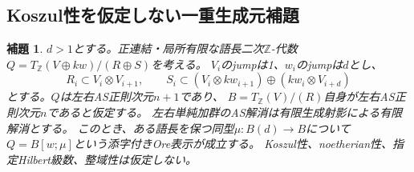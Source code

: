 \documentclass[11pt,a4paper]{ltjsarticle}
\newtheorem{lemma}[theorem]{補題}
\theoremstyle{definition}
\begin{document}
\subsection{Koszul性を仮定しない一重生成元補題}
\begin{lemma}\label{genidx:lem:one-heavy-as}
$d>1$とする。正連結・局所有限な語長二次$\mathbb Z$-代数
$Q=T_{\mathbb Z}(V\oplus kw)/(R\oplus S)$を考える。
$V_i$のjumpは1、$w_i$のjumpは$d$とし、
\[
R_i\subset V_i\otimes V_{i+1},\qquad
S_i\subset (V_i\otimes kw_{i+1})\oplus(kw_i\otimes V_{i+d})
\]
とする。$Q$は左右AS正則次元$n+1$であり、
$B=T_{\mathbb Z}(V)/(R)$自身が左右AS正則次元$n$であると仮定する。
左右単純加群のAS解消は有限生成射影による有限解消とする。
このとき、ある語長を保つ同型$\mu:B(d)\to B$について
$Q=B[w;\mu]$という添字付きOre表示が成立する。
Koszul性、noetherian性、指定Hilbert級数、整域性は仮定しない。
\end{lemma}
\end{document}
